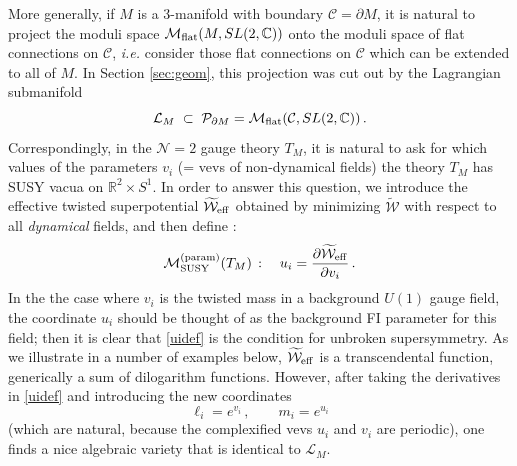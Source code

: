 \documentclass[hyper,letterpaper]{JHEP3}
\numberwithin{equation}{section}
\newcommand{\be}{\begin{equation}}
\newcommand{\ee}{\end{equation}}
\newcommand{\R}{{\mathbb R}}
\newcommand{\C}{{\mathbb C}}
\newcommand{\pd}{\partial}
\newcommand{\CC}{\mathcal{C}}
\newcommand{\CL}{\mathcal{L}}
\newcommand{\CM}{\mathcal{M}}
\newcommand{\CN}{\mathcal{N}}
\newcommand{\CP}{\mathcal{P}}
\newcommand{\CW}{\mathcal{W}}
\begin{document}
More generally, if $M$ is a 3-manifold with boundary $\CC = \partial M$, it is natural
to project the moduli space $\CM_{{\rm flat}} (M,SL(2,\C))$ onto the moduli space of
flat connections on $\CC$, {\it i.e.} consider those flat connections on $\CC$ which can be extended to all of $M$. In Section \ref{sec:geom}, this projection was cut out by the Lagrangian submanifold
%
\be \CL_M\;\subset\;\CP_{\pd M} = \CM_{\rm flat}(\CC,SL(2,\C))\,.\ee
%
Correspondingly, in the $\CN=2$ gauge theory $T_M$, it is natural to ask for which values of
the parameters $v_i$ (= vevs of non-dynamical fields) the theory $T_M$ has SUSY vacua on $\R^2 \times S^1$.
In order to answer this question, we introduce the effective twisted superpotential $\widetilde{\CW}_{{\rm eff}}$
obtained by minimizing $\widetilde{\CW}$ with respect to all {\it dynamical} fields, and then define \cite{DG-Sdual}:
%
\be
\CM_{\rm SUSY}^{\text{(param)}}(T_M)\,:\quad u_i = \frac{\partial \widetilde{\CW}_{{\rm eff}}}{\partial v_i} \,.
\label{uidef}
\ee
%
In the the case where $v_i$ is the twisted mass in a background $U(1)$ gauge field, the coordinate $u_i$ should be thought of as the background FI parameter for this field; then it is clear that \eqref{uidef} is the condition for unbroken supersymmetry.
As we illustrate in a number of examples below, $\widetilde{\CW}_{{\rm eff}}$
is a transcendental function, generically a sum of dilogarithm functions.
However, after taking the derivatives in \eqref{uidef} and introducing the new coordinates
%
\be
\ell_i = e^{v_i}\,, \qquad m_i = e^{u_i}
\label{lmviauv}
\ee
%
(which are natural, because the complexified vevs $u_i$ and $v_i$ are periodic),
one finds a nice algebraic variety that is identical to $\CL_M$.
\end{document}

